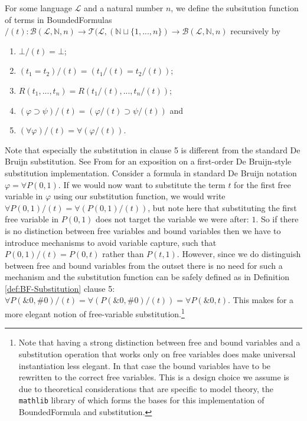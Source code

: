 \begin{definition}\label{def:BF-Substitution}
\leanok
{}
For some language $\mathcal{L}$ and a natural number $n$, we define the subsitution function of terms in BoundedFormulas $/(t) : \mathcal{B}(\mathcal{L},\mathbb{N},n) \to \mathcal{T}(\mathcal{L},(\mathbb{N} \sqcup \{1,...,n\}) \to \mathcal{B}(\mathcal{L},\mathbb{N},n)$ recursively by
\begin{enumerate}
\item $\bot/(t) = \bot$;
\item $(t_1 = t_2)/(t) = (t_1/(t) = t_2/(t))$;
\item $R(t_1,...,t_n) = R(t_1/(t),...,t_n/(t))$;
\item $(\varphi \supset \psi)/(t) = (\varphi/(t) \supset \psi/(t))$ and
\item $(\forall \varphi)/(t) = \forall (\varphi/(t))$.
\end{enumerate}
\end{definition}

Note that especially the substitution in clause 5 is different from the standard De Bruijn substitution. See From \cite{from:2021} for an exposition on a first-order De Bruijn-style substitution implementation. Consider a formula in standard De Bruijn notation $\varphi = \forall P(0,1)$. If we would now want to substitute the term $t$ for the first free variable in $\varphi$ using our substitution function, we would write $\forall P(0,1)/(t) = \forall (P(0,1)/(t))$, but note here that substituting the first free variable in $P(0,1)$ does not target the variable we were after: $1$. So if there is no distinction between free variables and bound variables then we have to introduce mechanisms to avoid variable capture, such that $P(0,1)/(t) = P(0,t)$ rather than $P(t,1)$. However, since we do distinguish between free and bound variables from the outset there is no need for such a mechanism and the substitution function can be safely defined as in Definition \ref{def:BF-Substitution} clause 5: $\forall P(\&0,\#0)/(t) = \forall (P(\&0,\#0)/(t)) = \forall P(\&0,t)$. This makes for a more elegant notion of free-variable substitution.\footnote{Note that having a strong distinction between free and bound variables and a substitution operation that works only on free variables does make universal instantiation less elegant. In that case the bound variables have to be rewritten to the correct free variables. This is a design choice we assume is due to theoretical considerations that are specific to model theory, the \texttt{mathlib} library of which forms the bases for this implementation of BoundedFormula and substitution.}

